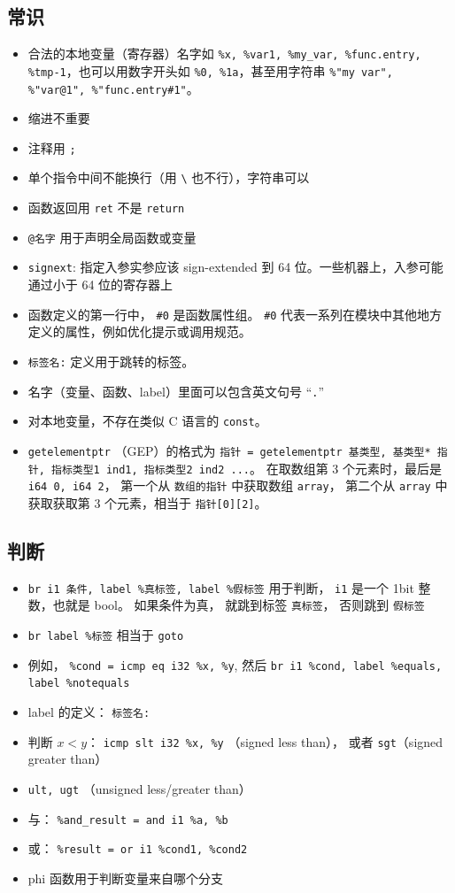 \subsection{常识}
\begin{itemize}
\item 合法的本地变量（寄存器）名字如 \verb`%x, %var1, %my_var, %func.entry, %tmp-1`，也可以用数字开头如 \verb`%0, %1a`，甚至用字符串 \verb`%"my var", %"var@1", %"func.entry#1"`。
\item 缩进不重要
\item 注释用 \verb`;`
\item 单个指令中间不能换行（用 \verb`\` 也不行），字符串可以
\item 函数返回用 \verb`ret` 不是 \verb`return`
\item \verb`@名字` 用于声明全局函数或变量
\item \verb`signext`: 指定入参实参应该 sign-extended 到 64 位。一些机器上，入参可能通过小于 64 位的寄存器上
\item 函数定义的第一行中， \verb`#0` 是函数属性组。 \verb`#0` 代表一系列在模块中其他地方定义的属性，例如优化提示或调用规范。
\item \verb`标签名:` 定义用于跳转的标签。
\item 名字（变量、函数、label）里面可以包含英文句号 “\verb`.`”
\item 对本地变量，不存在类似 C 语言的 \verb`const`。
\item \verb`getelementptr` （GEP）的格式为 \verb`指针 = getelementptr 基类型, 基类型* 指针, 指标类型1 ind1, 指标类型2 ind2 ...`。 在取数组第 3 个元素时，最后是 \verb`i64 0, i64 2`， 第一个从 \verb`数组的指针` 中获取数组 \verb`array`， 第二个从 \verb`array` 中获取获取第 3 个元素，相当于 \verb`指针[0][2]`。
\end{itemize}

\subsection{判断}
\begin{itemize}
\item \verb`br i1 条件, label %真标签, label %假标签` 用于判断， \verb`i1` 是一个 1bit 整数，也就是 bool。 如果条件为真， 就跳到标签 \verb`真标签`， 否则跳到 \verb`假标签`
\item \verb`br label %标签` 相当于 \verb`goto`
\item 例如， \verb`%cond = icmp eq i32 %x, %y`, 然后 \verb`br i1 %cond, label %equals, label %notequals`
\item label 的定义： \verb`标签名:`
\item 判断 $x < y$： \verb`icmp slt i32 %x, %y` （signed less than）， 或者 \verb`sgt`（signed greater than）
\item \verb`ult, ugt` （unsigned less/greater than）
\item 与： \verb`%and_result = and i1 %a, %b`
\item 或： \verb`%result = or i1 %cond1, %cond2`
\item phi 函数用于判断变量来自哪个分支
\end{itemize}

